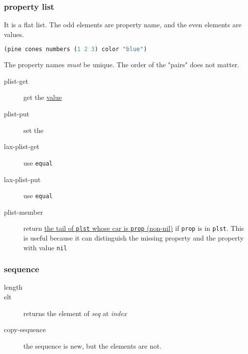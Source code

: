 \subsubsection{property list}
It is a flat list. The odd elements are property name, and the even elements are values.

\begin{lstlisting}[language=lisp]
(pine cones numbers (1 2 3) color "blue")
\end{lstlisting}
The property names \textit{must} be unique.
The order of the "pairs" does not matter.
\begin{description}
\item [plist-get ] get the \uline{value}
\item [plist-put ] set the 
\item [lax-plist-get] use \texttt{equal}
\item [lax-plist-put] use \texttt{equal}
\item [plist-member ] return \uline{the tail of
    \texttt{plst} whose car is \texttt{prop} (non-nil)} if \texttt{prop} is in
  \texttt{plst}. This is useful because it can distinguish the missing
  property and the property with value \texttt{nil}
\end{description}


\subsubsection{sequence}


\begin{description}
\item [length ]
\item [elt ] returns the element of \textit{seq} at \textit{index}
\item [copy-sequence ] the sequence is new, but the elements are not.
\end{description}

